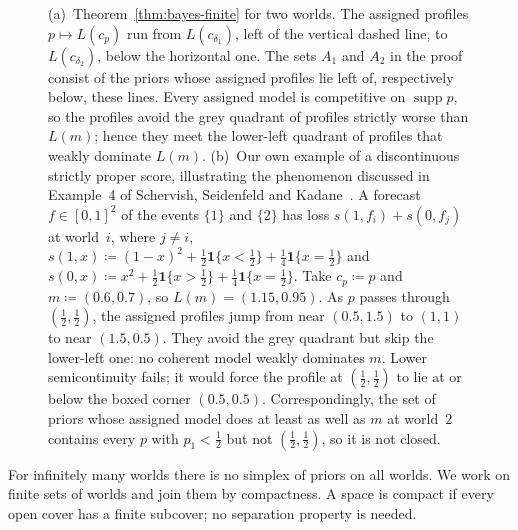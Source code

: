 \documentclass[11pt]{article}
\theoremstyle{definition}
\theoremstyle{remark}
\newcommand{\one}{\mathbf 1}
\newcommand{\supp}{\operatorname{supp}}
\begin{document}
\begin{figure}[ht]
\caption{(a)~Theorem~\ref{thm:bayes-finite} for two worlds. The assigned profiles $p\mapsto L(c_p)$ run from $L(c_{\delta_1})$, left of the vertical dashed line, to $L(c_{\delta_2})$, below the horizontal one. The sets $A_1$ and $A_2$ in the proof consist of the priors whose assigned profiles lie left of, respectively below, these lines. Every assigned model is competitive on $\supp p$, so the profiles avoid the grey quadrant of profiles strictly worse than $L(m)$; hence they meet the lower-left quadrant of profiles that weakly dominate $L(m)$. (b)~Our own example of a discontinuous strictly proper score, illustrating the phenomenon discussed in Example~4 of Schervish, Seidenfeld and Kadane~\cite{SSK09}. A forecast $f\in[0,1]^2$ of the events $\{1\}$ and $\{2\}$ has loss $s(1,f_i)+s(0,f_j)$ at world~$i$, where $j\ne i$, $s(1,x)\coloneqq(1-x)^2+\frac12\one\{x<\frac12\}+\frac14\one\{x=\frac12\}$ and $s(0,x)\coloneqq x^2+\frac12\one\{x>\frac12\}+\frac14\one\{x=\frac12\}$. Take $c_p\coloneqq p$ and $m\coloneqq(0.6,0.7)$, so $L(m)=(1.15,0.95)$. As $p$ passes through $(\frac12,\frac12)$, the assigned profiles jump from near $(0.5,1.5)$ to $(1,1)$ to near $(1.5,0.5)$. They avoid the grey quadrant but skip the lower-left one: no coherent model weakly dominates $m$. Lower semicontinuity fails; it would force the profile at $(\frac12,\frac12)$ to lie at or below the boxed corner $(0.5,0.5)$. Correspondingly, the set of priors whose assigned model does at least as well as $m$ at world~$2$ contains every $p$ with $p_1<\frac12$ but not $(\frac12,\frac12)$, so it is not closed.}
\label{fig:profiles}
\end{figure}

For infinitely many worlds there is no simplex of priors on all worlds. We work on finite sets of worlds and join them by compactness. A space is compact if every open cover has a finite subcover; no separation property is needed.
\end{document}
